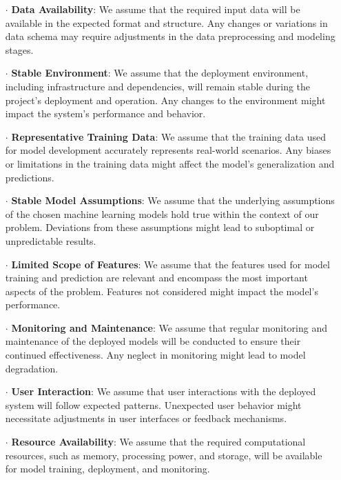 \documentclass{report}
\begin{document}
\begin{itemize}
    \item[$\cdot$] \textbf{Data Availability}: We assume that the required input data will be available in the expected format and structure. Any changes or variations in data schema may require adjustments in the data preprocessing and modeling stages.
    
    \item[$\cdot$] \textbf{Stable Environment}: We assume that the deployment environment, including infrastructure and dependencies, will remain stable during the project's deployment and operation. Any changes to the environment might impact the system's performance and behavior.
        
    \item[$\cdot$] \textbf{Representative Training Data}: We assume that the training data used for model development accurately represents real-world scenarios. Any biases or limitations in the training data might affect the model's generalization and predictions.
        
    \item[$\cdot$] \textbf{Stable Model Assumptions}: We assume that the underlying assumptions of the chosen machine learning models hold true within the context of our problem. Deviations from these assumptions might lead to suboptimal or unpredictable results.
        
    \item[$\cdot$] \textbf{Limited Scope of Features}: We assume that the features used for model training and prediction are relevant and encompass the most important aspects of the problem. Features not considered might impact the model's performance.
        
    \item[$\cdot$] \textbf{Monitoring and Maintenance}: We assume that regular monitoring and maintenance of the deployed models will be conducted to ensure their continued effectiveness. Any neglect in monitoring might lead to model degradation.
        
    \item[$\cdot$] \textbf{User Interaction}: We assume that user interactions with the deployed system will follow expected patterns. Unexpected user behavior might necessitate adjustments in user interfaces or feedback mechanisms.
        
    \item[$\cdot$] \textbf{Resource Availability}: We assume that the required computational resources, such as memory, processing power, and storage, will be available for model training, deployment, and monitoring.
\end{itemize}
\end{document}

